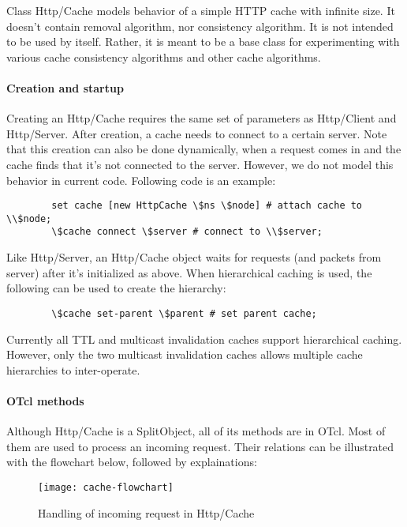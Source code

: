 Class Http/Cache models behavior of a simple HTTP cache with infinite 
size. It doesn't contain removal algorithm, nor consistency algorithm. 
It is not intended to be used by itself. Rather, it is meant to be a 
base class for experimenting with various cache consistency algorithms and
other cache algorithms. 

\paragraph{Creation and startup}

Creating an Http/Cache requires the same set of parameters as
Http/Client and Http/Server. After creation, a cache needs to connect 
to a certain server. Note that this creation can also be done dynamically,
when a request comes in and the cache finds that it's not connected to 
the server. However, we do not model this behavior in current code.
Following code is an example:

\begin{verbatim}
        set cache [new HttpCache \$ns \$node] # attach cache to \\$node;
        \$cache connect \$server # connect to \\$server;
\end{verbatim}

Like Http/Server, an Http/Cache object waits for requests (and packets
from server) after it's initialized as above. When hierarchical
caching is used, the following can be used to create the hierarchy:

\begin{verbatim}
        \$cache set-parent \$parent # set parent cache;
\end{verbatim}

Currently all TTL and multicast invalidation caches support hierarchical
caching. However, only the two multicast invalidation caches allows 
multiple cache hierarchies to inter-operate.

\paragraph{OTcl methods}

Although Http/Cache is a SplitObject, all of its methods are in OTcl. 
Most of them are used to process an incoming request. Their relations can
be illustrated with the flowchart below, followed by explainations:

\begin{figure}[ht]
  \begin{center}
    \texttt{[image: cache-flowchart]}
    \caption{Handling of incoming request in Http/Cache}
    \label{fig:webcache-handle-request}
  \end{center}
\end{figure}

